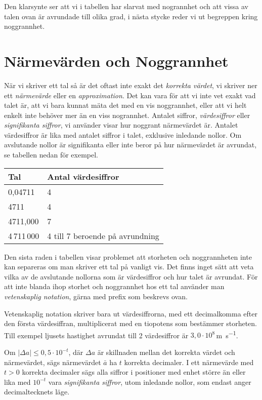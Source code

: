 \bigskip

Den klarsynte ser att vi i tabellen har slarvat med nogrannhet och att
vissa av talen ovan är avrundade till olika grad, i nästa stycke reder
vi ut begreppen kring noggrannhet.

\section{Närmevärden och Noggrannhet}

När vi skriver ett tal så är det oftast inte exakt det \emph{korrekta
värdet}, vi skriver ner ett \emph{närmevärde} eller en
\emph{approximation}.  Det kan vara för att vi inte vet exakt vad
talet är, att vi bara kunnat mäta det med en vis noggrannhet, eller
att vi helt enkelt inte behöver mer än en viss nogrannhet. Antalet
siffror, \emph{värdesiffror} eller \emph{signifikanta siffror}, vi
använder visar hur noggrant närmevärdet är.  Antalet värdesiffror är
lika med antalet siffror i talet, exklusive inledande nollor.  Om
avslutande nollor är signifikanta eller inte beror på hur närmevärdet
är avrundat, se tabellen nedan för exempel.

\bigskip
\begin{centering}
\begin{tabular}{|l|l|}
\hline
Tal & Antal värdesiffror \\
\hline
0,04711 & 4\\
4711 & 4 \\
4711,000 & 7 \\
4\,711\,000 & 4 till 7 beroende på avrundning \\
\hline
\end{tabular}
\end{centering}
\bigskip

Den sista raden i tabellen visar problemet att storheten och
noggrannheten inte kan separeras om man skriver ett tal på vanligt
vis. Det finns inget sätt att veta vilka av de avslutande nollorna som
är värdesiffror och hur talet är avrundat.  För att inte blanda ihop
storhet och noggrannhet hos ett tal använder man \emph{vetenskaplig
notation}, gärna med prefix som beskrevs ovan.

Vetenskaplig notation skriver bara ut värdesiffrorna, med ett
decimalkomma efter den första värdesiffran, multiplicerat med en
tiopotens som bestämmer storheten. Till exempel ljusets hastighet
avrundat till 2 värdesiffror är $3,0 \cdot 10^8$\,\unit{\metre\per\second}.

Om $|\Delta a|\leq 0,5\cdot 10^{-t}$, där $\Delta a$ är skillnaden
mellan det korrekta värdet och närmevärdet, sägs närmevärdet $\bar
{a}$ ha $t$ korrekta decimaler.
I ett närmevärde med $t>0$ korrekta decimaler sägs alla siffror i
positioner med enhet större än eller lika med $10^{-t}$ vara
\emph{signifikanta siffror}, utom inledande nollor, som endast anger
decimaltecknets läge.

